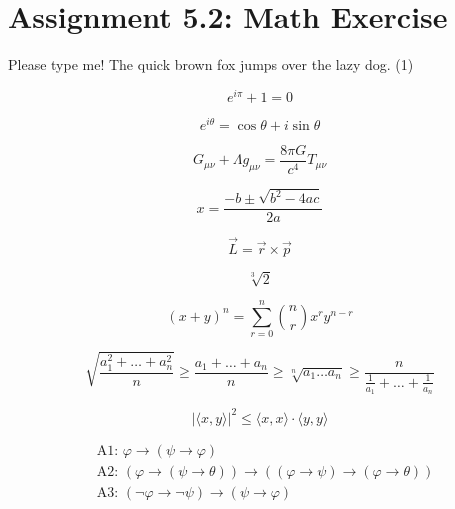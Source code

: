 \chapter{Assignment 5.2: Math Exercise}

\noindent \hspace*{\fill} Please type me! The quick brown fox jumps over the lazy dog. \hspace*{\fill} (1)

\begin{equation}
    e^{i\pi} + 1 = 0
\end{equation}

\begin{equation}
    e^{i\theta} = \cos \theta + i \sin \theta
\end{equation}

\begin{equation}
    G_{\mu\nu} + \Lambda g_{\mu\nu} = \frac{8\pi G}{c^4} T_{\mu\nu}
\end{equation}

\begin{equation}
    x = \frac{-b \pm \sqrt{b^2 - 4ac}}{2a}
\end{equation}

\begin{equation}
    \vec{L} = \vec{r} \times \vec{p}
\end{equation}

\begin{equation}
    \sqrt[3]{2}
\end{equation}

\begin{equation}
    (x + y)^n = \sum_{r=0}^{n} \binom{n}{r} x^r y^{n-r}
\end{equation}

\begin{equation}
    \sqrt{\frac{a_1^2 + \dots + a_n^2}{n}} \geq \frac{a_1 + \dots + a_n}{n} \geq \sqrt[n]{a_1 \dots a_n} \geq \frac{n}{\frac{1}{a_1} + \dots + \frac{1}{a_n}}
\end{equation}

\begin{equation}
    |\langle x, y \rangle|^2 \leq \langle x, x \rangle \cdot \langle y, y \rangle
\end{equation}

\begin{equation}
    \begin{aligned}
        &\text{A1: } \varphi \longrightarrow (\psi \longrightarrow \varphi) \\
        &\text{A2: } (\varphi \longrightarrow (\psi \longrightarrow \theta)) \longrightarrow ((\varphi \longrightarrow \psi) \longrightarrow (\varphi \longrightarrow \theta)) \\
        &\text{A3: } (\neg \varphi \longrightarrow \neg \psi) \longrightarrow (\psi \longrightarrow \varphi)
    \end{aligned}
\end{equation}
